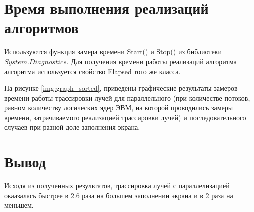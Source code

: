 \section{Время выполнения реализаций алгоритмов}

Используются функция замера времени Start() и Stop() из библиотеки $System.Diagnostics$. Для получения времени работы реализаций алгоритма алгоритма используется свойство Elapsed того же класса.

На рисунке \ref{img:graph_sorted},  приведены графические результаты замеров времени работы трассировки лучей для параллельного (при количестве потоков, равном количеству логических ядер ЭВМ, на которой проводились замеры времени, затрачиваемого реализацией трассировки лучей) и последовательного случаев при разной доле заполнения экрана.

\begin{center}
	\label{img:graph_sorted}
\end{center}

\section*{Вывод}
Исходя из полученных результатов, трассировка лучей с параллелизацией окаазалась быстрее в 2.6 раза на большем заполнении экрана и  в 2 раза на меньшем.